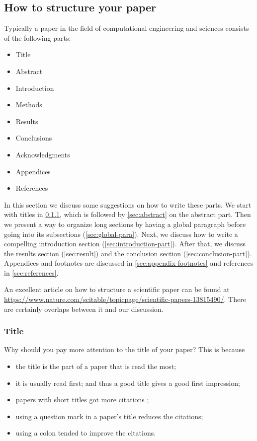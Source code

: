\documentclass[authoryear,12pta4paper,fleqn]{article}
\numberwithin{equation}{section}
\theoremstyle{remark}
\begin{document}
\subsection{How to structure your paper}\label{structure}

Typically a paper in the field of  computational engineering and sciences consists of the following parts:

\begin{itemize}
    \item Title
    \item Abstract
    \item Introduction
    \item Methods
    \item Results
    \item Conclusions
    \item Acknowledgments
    \item Appendices
    \item References
\end{itemize}
 In this section we discuss some suggestions on how to write  these parts. We start with titles in \cref{sec:title}, which is followed by \cref{sec:abstract} on the abstract part. Then we present a way to organize long sections by having a global paragraph before going into its subsections (\cref{sec:global-para}). Next, we discuss how to write a compelling introduction section (\cref{sec:introduction-part}). After that, we discuss the results section (\cref{sec:result}) and the conclusion section (\cref{sec:conclusion-part}).  Appendices and footnotes are discussed in \cref{sec:appendix-footnotes} and references in \cref{sec:references}.

An excellent article on how to structure a scientific paper can be found at \url{https://www.nature.com/scitable/topicpage/scientific-papers-13815490/}. There are certainly overlaps between it and our discussion. 



\subsubsection{Title}\label{sec:title}

Why should you pay more attention to the title of your paper? This is because
\begin{itemize}
\item the title  is the part of a paper that is read the most;
\item it is usually read first; and thus a good title gives a good first impression;
\item papers with short titles  got more citations \citep{paiva2012articles};
\item using a question mark in a paper’s title reduces the citations;
\item using a colon tended to improve the citations.
\end{itemize}
\end{document}
